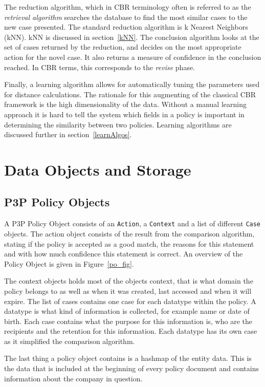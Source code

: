 The reduction algorithm, which in CBR terminology often is referred to as the \emph{retrieval algorithm} searches the database to find the most similar cases to the new case presented. The standard reduction algorithm is k Nearest Neighbors (kNN). kNN is discussed in section~\ref{kNN}. The conclusion algorithm looks at the set of cases returned by the reduction, and decides on the most appropriate action for the novel case. It also returns a measure of confidence in the conclusion reached. In CBR terms, this corresponds to the \emph{revise} phase.

Finally, a learning algorithm allows for automatically tuning the parameters used for distance calculations. The rationale for this augmenting of the classical CBR framework is the high dimensionality of the data. Without a manual learning approach it is hard to tell the system which fields in a policy is important in determining the similarity between two policies. Learning algorithms are discussed further in section~\ref{learnAlgos}.


\section{Data Objects and Storage}

\subsection{P3P Policy Objects}\label{p3pPolObj}
A P3P Policy Object consists of an \texttt{Action}, a \texttt{Context} and a list of different \texttt{Case} objects. The action object consists of the result from the comparison algorithm, stating if the policy is accepted as a good match, the reasons for this statement and with how much confidence this statement is correct. An overview of the Policy Object is given in Figure~\ref{po_fig}.

The context objects holds most of the objects context, that is what domain the policy belongs to as well as when it was created, last accessed and when it will expire. The list of cases contains one case for each datatype within the policy. A datatype is what kind of information is collected, for example name or date of birth. Each case contains what the purpose for this information is, who are the recipients and the retention for this information. Each datatype has its own case as it simplified the comparison algorithm.

The last thing a policy object contains is a hashmap of the entity data. This is the data that is included at the beginning of every policy document and contains information about the company in question.

